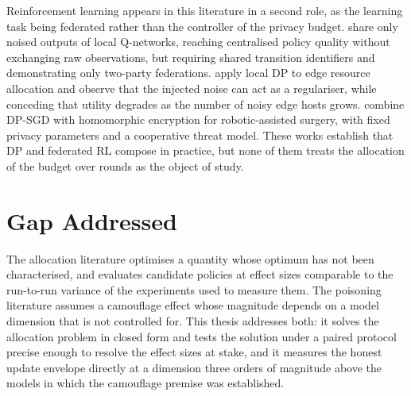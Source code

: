 Reinforcement learning appears in this literature in a second role, as the
learning task being federated rather than the controller of the privacy budget.
\citeauthor{ZhuoFederatedDRL} \cite{ZhuoFederatedDRL} share only noised outputs
of local Q-networks, reaching centralised policy quality without exchanging raw
observations, but requiring shared transition identifiers and demonstrating only
two-party federations. \citeauthor{ZhouConcurrentFRLIoT}
\cite{ZhouConcurrentFRLIoT} apply local DP to edge resource allocation and
observe that the injected noise can act as a regulariser, while conceding that
utility degrades as the number of noisy edge hosts grows.
\citeauthor{HafeezFDRLRoboticSurgery} \cite{HafeezFDRLRoboticSurgery} combine
DP-SGD with homomorphic encryption for robotic-assisted surgery, with fixed
privacy parameters and a cooperative threat model. These works establish that DP
and federated RL compose in practice, but none of them treats the allocation of
the budget over rounds as the object of study.

\section{Gap Addressed}

The allocation literature optimises a quantity whose optimum has not been
characterised, and evaluates candidate policies at effect sizes comparable to
the run-to-run variance of the experiments used to measure them. The poisoning
literature assumes a camouflage effect whose magnitude depends on a model
dimension that is not controlled for. This thesis addresses both: it solves the
allocation problem in closed form and tests the solution under a paired protocol
precise enough to resolve the effect sizes at stake, and it measures the honest
update envelope directly at a dimension three orders of magnitude above the
models in which the camouflage premise was established.
